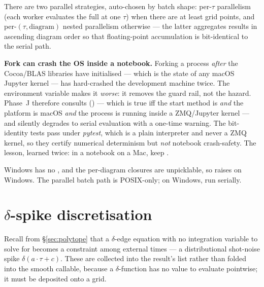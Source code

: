 There are two parallel strategies, auto-chosen by batch shape: per-$\tau$
parallelism (each worker evaluates the full  at one $\tau$) when
there are at least  grid points, and per-$(\tau, \text{diagram})$
nested parallelism otherwise --- the latter aggregates results in ascending
diagram order so that floating-point accumulation is bit-identical to the serial
path.

\begin{gotcha}
\textbf{Fork can crash the OS inside a notebook.} Forking a process \emph{after}
the Cocoa/BLAS libraries have initialised --- which is the state of any macOS
Jupyter kernel --- has hard-crashed the development machine twice. The environment
variable  makes it \emph{worse}:
it removes the guard rail, not the hazard. Phase~J therefore consults
 () --- which is true iff
the start method is  \emph{and} the platform is macOS \emph{and} the
process is running inside a ZMQ/Jupyter kernel --- and silently degrades to serial
evaluation with a one-time warning. The bit-identity tests
 pass under \emph{pytest}, which is a plain
interpreter and never a ZMQ kernel, so they certify numerical determinism but
\emph{not} notebook crash-safety. The lesson, learned twice: in a notebook on a
Mac, keep .
\end{gotcha}

\begin{gotcha}
Windows has no , and the per-diagram closures are unpicklable, so
 raises  on Windows. The parallel batch path is POSIX-only; on Windows, run
serially.
\end{gotcha}

\section{$\delta$-spike discretisation}\label{sec:deltaspike}

Recall from \S\ref{sec:polytope} that a $\delta$-edge equation with no
integration variable to solve for becomes a constraint among external times --- a
distributional shot-noise spike $\delta(a\cdot\tau + c)$. These are collected
into the result's  list rather than folded into the
smooth callable, because a $\delta$-function has no value to evaluate pointwise;
it must be deposited onto a grid.

